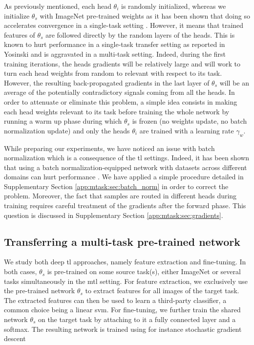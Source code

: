 As previously mentioned, each head $\theta_i$ is randomly initialized, whereas we initialize $\theta_s$ with ImageNet pre-trained weights as it has been shown that doing so accelerates convergence in a single-task setting \cite{mormont2018comparison}. However, it means that trained features of $\theta_s$ are followed directly by the random layers of the heads. This is known to hurt performance in a single-task transfer setting as reported in Yosinski \etal \cite{yosinski2014transferable} and is aggravated in a multi-task setting. Indeed, during the first training iterations, the heads gradients will be relatively large and will work to turn each head weights from random to relevant with respect to its task. However, the resulting back-propagated gradients in the last layer of $\theta_s$ will be an average of the potentially contradictory signals coming from all the heads. In order to attenuate or eliminate this problem, a simple idea consists in making each head weights relevant to its task before training the whole network by running a warm up phase during which $\theta_s$ is frozen (\ie no weights update, no batch normalization update) and only the heads $\theta_i$ are trained with a learning rate $\gamma_w$. 

While preparing our experiments, we have noticed an issue with batch normalization \cite{ioffe2015batch} which is a consequence of the \acrlong{tl} settings. Indeed, it has been shown that using a batch normalization-equipped network with datasets across different domains can hurt performance \cite{li2018adaptive, chang2019domain}. We have applied a simple procedure detailed in Supplementary Section \ref{app:mtask:sec:batch_norm} in order to correct the problem. Moreover, the fact that samples are routed in different heads during training requires careful treatment of the gradients after the forward phase. This question is discussed in Supplementary Section \ref{app:mtask:sec:gradients}.

\subsection{Transferring a multi-task pre-trained network}
\label{ssec:mtask:transfer_techniques}

We study both deep \acrlong{tl} approaches, namely feature extraction and fine-tuning. In both cases, $\theta_s$ is pre-trained on some source task(s), either ImageNet or several tasks simultaneously in the \acrshort{mtl} setting. For feature extraction, we exclusively use the pre-trained network $\theta_s$ to extract features for all images of the target task. The extracted features can then be used to learn a third-party classifier, a common choice being a linear \acrshort{svm}. For fine-tuning, we further train the shared network $\theta_s$ on the target task by attaching to it a fully connected layer and a softmax. The resulting network is trained using for instance stochastic gradient descent

